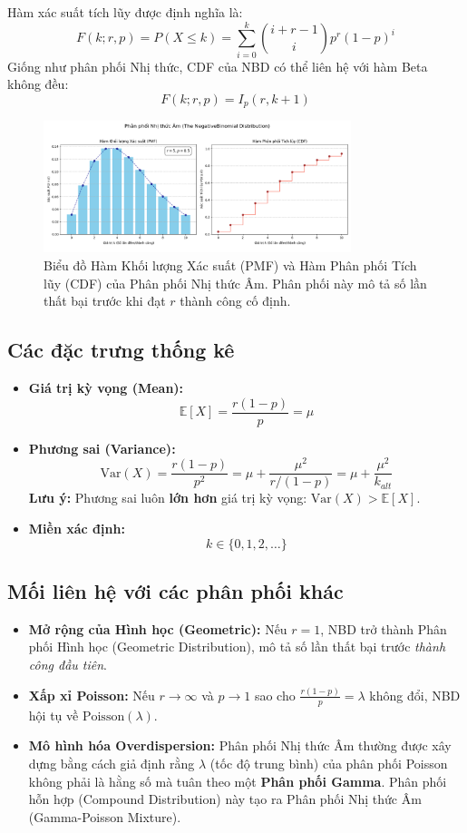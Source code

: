 Hàm xác suất tích lũy được định nghĩa là:
\[
F(k; r, p) = P(X \leq k) = \sum_{i = 0}^{k} \binom{i + r - 1}{i} p^r (1 - p)^{i}
\]
Giống như phân phối Nhị thức, CDF của NBD có thể liên hệ với hàm Beta không đều:
\[
F(k; r, p) = I_{p}(r, k + 1)
\]

\begin{figure}[h!]
 \centering
 \includegraphics[width=0.8\textwidth]{images/NegativeBinomial_PMF_and_CDF.png}
\caption{Biểu đồ Hàm Khối lượng Xác suất (PMF) và Hàm Phân phối Tích lũy (CDF) của Phân phối Nhị thức Âm. Phân phối này mô tả số lần thất bại trước khi đạt $r$ thành công cố định.}
\label{fig:nbinomial_dist}
\end{figure}

\subsection{Các đặc trưng thống kê}

\begin{itemize}
\item \textbf{Giá trị kỳ vọng (Mean):} 
 $$
\mathbb{E}[X] = \frac{r(1 - p)}{p} = \mu
    $$
\item \textbf{Phương sai (Variance):} 
$$
\mathrm{Var}(X) = \frac{r(1 - p)}{p^2} = \mu + \frac{\mu^2}{r/{(1-p)}} = \mu + \frac{\mu^2}{k_{alt}}
$$
    \textbf{Lưu ý:} Phương sai luôn \textbf{lớn hơn} giá trị kỳ vọng: $\mathrm{Var}(X) > \mathbb{E}[X]$.
\item \textbf{Miền xác định:}
 $$
 k \in \{0, 1, 2, \dots\}
 $$
\end{itemize}

\subsection{Mối liên hệ với các phân phối khác}

\begin{itemize}
\item \textbf{Mở rộng của Hình học (Geometric):} Nếu $r=1$, NBD trở thành Phân phối Hình học (Geometric Distribution), mô tả số lần thất bại trước \textit{thành công đầu tiên}.
\item \textbf{Xấp xỉ Poisson:} Nếu $r \to \infty$ và $p \to 1$ sao cho $\frac{r(1-p)}{p} = \lambda$ không đổi, NBD hội tụ về $\mathrm{Poisson}(\lambda)$.
\item \textbf{Mô hình hóa Overdispersion:} Phân phối Nhị thức Âm thường được xây dựng bằng cách giả định rằng $\lambda$ (tốc độ trung bình) của phân phối Poisson không phải là hằng số mà tuân theo một \textbf{Phân phối Gamma}. Phân phối hỗn hợp (Compound Distribution) này tạo ra Phân phối Nhị thức Âm (Gamma-Poisson Mixture).
\end{itemize}

